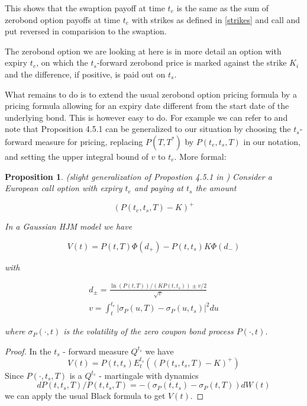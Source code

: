 \documentclass{amsart}
\theoremstyle{plain}
\newtheorem{proposition}{Proposition}
\numberwithin{equation}{section}
\begin{document}
This shows that the swaption payoff at time $t_e$ is the same as the sum of zerobond option payoffs at time $t_e$ with strikes as defined in \ref{strikes} and call and put reversed in comparision to the swaption.

The zerobond option we are looking at here is in more detail an option with expiry $t_e$, on which the $t_s$-forward zerobond price is marked against the strike $K_i$ and the difference, if positive, is paid out on $t_s$.

What remains to do is to extend the usual zerobond option pricing formula by a pricing formula allowing for an expiry date different from the start date of the underlying bond. This is however easy to do. For example we can refer to \cite{piterbarg} and note that Proposition 4.5.1 can be generalized to our situation by choosing the $t_s$-forward measure for pricing, replacing $P(T,T^*)$ by $P(t_e,t_s,T)$ in our notation, and setting the upper integral bound of $v$ to $t_e$. More formal:

\begin{proposition}
(slight generalization of Propostion 4.5.1 in \cite{piterbarg}) Consider a European call option with expiry $t_e$ and paying at $t_s$ the amount

\begin{equation}
(P(t_e,t_s,T)-K)^+
\end{equation}

In a Gaussian HJM model we have

\begin{equation}
V(t) = P(t,T)\Phi(d_+) - P(t,t_s)K\Phi(d_-)
\end{equation}

with

\begin{eqnarray}
d_{\pm} = \frac{\ln(P(t,T))/(KP(t,t_s)) \pm v/2}{\sqrt{v}} \\
v = \int_t^{t_e} | \sigma_P(u,T) - \sigma_P(u,t_s) |^2 du
\end{eqnarray}

where $\sigma_P(\cdot,t)$ is the volatility of the zero coupon bond process $P(\cdot,t)$.

\end{proposition}

\begin{proof}
In the $t_s$ - forward measure $Q^{t_s}$ we have
\begin{equation}
V(t) = P(t,t_s) E^{t_s}_t \left( (P(t_s,t_s,T)-K)^+ \right)
\end{equation}
Since $P(\cdot,t_s,T)$ is a $Q^{t_s}$ - martingale with dynamics
\begin{equation}
dP(t,t_s,T)/P(t,t_s,T) = - ( \sigma_P(t,t_s) - \sigma_P(t,T) ) dW(t)
\end{equation}
we can apply the usual Black formula to get $V(t)$.
\end{proof}
\end{document}
